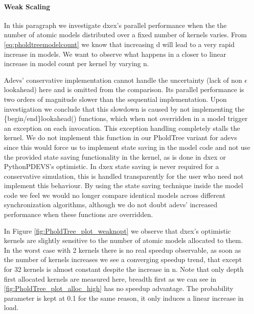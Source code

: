 \paragraph*{Weak Scaling}
In this paragraph we investigate dxex's parallel performance when the the number of atomic models distributed over a fixed number of kernels varies. From \ref{eq:pholdtreemodelcount} we know that increasing d will lead to a very rapid increase in models. We want to observe what happens in a closer to linear increase in model count per kernel by varying n.

Adevs' conservative implementation cannot handle the uncertainty (lack of non $\epsilon$ lookahead) here and is omitted from the comparison. Its parallel performance is two orders of magnitude slower than the sequential implementation. Upon investigation we conclude that this slowdown is caused by not implementing the \{begin/end\}lookahead() functions, which when not overridden in a model trigger an exception on each invocation.
This exception handling completely stalls the kernel. We do not implement this function in our PholdTree variant for adevs since this would force us to implement state saving in the model code and not use the provided state saving functionality in the kernel, as is done in dxex or PythonPDEVS's optimistic.
In dxex state saving is never required for a conservative simulation, this is handled transparently for the user who need not implement this behaviour.
By using the state saving technique inside the model code we feel we would no longer compare identical models across different synchronization algorithms, although we do not doubt adevs' increased performance when these functions are overridden.

In Figure \ref{fig:PholdTree_plot_weaknopt} we observe that dxex's optimistic kernels are slightly sensitive to the number of atomic models allocated to them. In the worst case with 2 kernels there is no real speedup observable, as soon as the number of kernels increases we see a converging speedup trend, that except for 32 kernels is almost constant despite the increase in n. Note that only depth first allocated kernels are measured here, breadth first as we can see in \ref{fig:PholdTree_plot_alloc_high} has no speedup advantage. The probability parameter is kept at 0.1 for the same reason, it only induces a linear increase in load.

